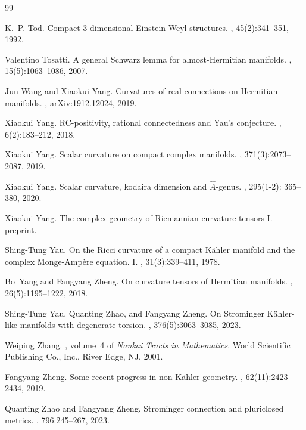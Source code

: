\documentclass[12pt]{amsart}
\theoremstyle{plain}
\theoremstyle{definition}
\renewcommand{\hat}{\widehat}
\renewcommand{\>}{\rightarrow}
\numberwithin{equation}{section} %
\begin{document}
\begin{thebibliography}{99}
	
	
	K.~P. Tod.
	\newblock Compact {$3$}-dimensional {E}instein-{W}eyl structures.
	, 45(2):341--351, 1992.
	
	Valentino Tosatti.
	\newblock A general {S}chwarz lemma for almost-{H}ermitian manifolds.
	, 15(5):1063--1086, 2007.
	
	Jun Wang and Xiaokui Yang.
	\newblock Curvatures of real connections on {H}ermitian manifolds.
	, arXiv:1912.12024, 2019.
	
	
	Xiaokui Yang.
	\newblock R{C}-positivity, rational connectedness and {Y}au's conjecture.
	, 6(2):183--212, 2018.
	

	
	Xiaokui Yang.
	\newblock Scalar curvature on compact complex manifolds.
	, 371(3):2073--2087, 2019.
	
	Xiaokui Yang.
	\newblock Scalar curvature, kodaira dimension and $\hat {A}$-genus.
	, 295(1-2): 365--380, 2020.
	
	Xiaokui Yang.
	\newblock The complex geometry of Riemannian curvature tensors I. preprint.
	
	Shing-Tung Yau.
	\newblock On the {R}icci curvature of a compact {K}\"{a}hler manifold and the
	complex {M}onge-{A}mp\`ere equation. {I}.
	, 31(3):339--411, 1978.
	
	Bo~Yang and Fangyang Zheng.
	\newblock On curvature tensors of {H}ermitian manifolds.
	, 26(5):1195--1222, 2018.
	
	Shing-Tung Yau, Quanting Zhao, and Fangyang Zheng.
	\newblock On {S}trominger {K}\"{a}hler-like manifolds with degenerate torsion.
	, 376(5):3063--3085, 2023.
	
	Weiping Zhang.
	,
	volume~4 of {\em Nankai Tracts in Mathematics}.
	\newblock World Scientific Publishing Co., Inc., River Edge, NJ, 2001.
	
	Fangyang Zheng.
	\newblock Some recent progress in non-{K}\"{a}hler geometry.
	, 62(11):2423--2434, 2019.
	
	Quanting Zhao and Fangyang Zheng.
	\newblock Strominger connection and pluriclosed metrics.
	, 796:245--267, 2023.
	
\end{thebibliography}
\end{document}
